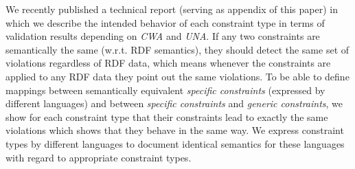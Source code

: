 \documentclass[a4paper,fontsize=11pt]{scrartcl}
\begin{document}





We recently published a technical report \cite{BoschNolleAcarEckert2015} (serving as appendix of this paper) in which
we describe the intended behavior of each constraint type in terms of validation results depending on \emph{CWA} and \emph{UNA}.
If any two constraints are semantically the same (w.r.t. RDF semantics), they should detect the same set of violations regardless of RDF data, 
which means whenever the constraints are applied to any RDF data they point out the same violations.
To be able to define mappings between semantically equivalent \emph{specific constraints} (expressed by different languages) and 
between \emph{specific constraints} and \emph{generic constraints},
we show for each constraint type that their constraints lead to exactly the same violations which shows that they behave in the same way. 
We express constraint types by different languages
to document identical semantics for these languages with regard to appropriate constraint types. 
\end{document}
